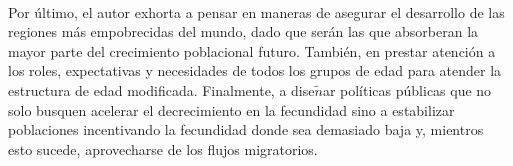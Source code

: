 \documentclass[10pt,spanish,letterpaper]{article}
\theoremstyle{plain}
\begin{document}
\\
Por \'ultimo, el autor exhorta a pensar en maneras de asegurar el desarrollo de las regiones m\'as empobrecidas del mundo, dado que ser\'an las que absorberan la mayor parte del crecimiento poblacional futuro. Tambi\'en, en prestar atenci\'on a los roles, expectativas y necesidades de todos los grupos de edad para atender la estructura de edad modificada. Finalmente, a dise$\tilde{n}$ar pol\'iticas p\'ublicas que no solo busquen acelerar el decrecimiento en la fecundidad sino a estabilizar poblaciones incentivando la fecundidad donde sea demasiado baja y, mientros esto sucede, aprovecharse de los flujos migratorios.


\end{document}
